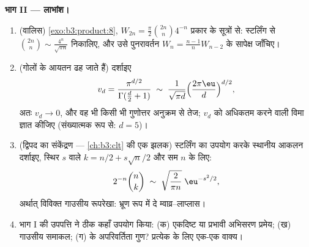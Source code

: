 \begin{problem}
\medskip
\noindent\textbf{भाग II --- लाभांश।}
\begin{enumerate}[resume]
  \item (वालिस) \cref{exo:b3:product:8}, $W_{2n} =
        \frac\pi2\binom{2n}n4^{-n}$ प्रकार के सूत्रों से: स्टर्लिंग से
        $\binom{2n}{n} \sim \frac{4^n}{\sqrt{\pi n}}$ निकालिए, और उसे पुनरावर्तन $W_{n} =
        \frac{n-1}nW_{n-2}$ के सापेक्ष
        जाँचिए।
  \item (गोलों के आयतन ढह जाते हैं) दर्शाइए
        \[
        v_d = \frac{\pi^{d/2}}{\Gamma(\frac d2 + 1)}
        \;\sim\; \frac{1}{\sqrt{\pi d}}
        \Bigl(\frac{2\pi\eu}{d}\Bigr)^{d/2},
        \]
        अतः $v_d \to 0$, और वह भी किसी भी गुणोत्तर अनुक्रम से तेज;
        $v_d$ को अधिकतम करने वाली विमा ज्ञात कीजिए (संख्यात्मक
        रूप से: $d =
        5$)।
  \item (द्विपद का संकेंद्रण --- \cref{ch:b3:clt} की एक झलक) स्टर्लिंग का
        उपयोग करके स्थानीय आकलन दर्शाइए, स्थिर $s$ वाले $k = n/2 + s\sqrt n/2$
        और सम $n$ के लिए:
        \[
        2^{-n}\binom{n}{k} \;\sim\;
        \sqrt{\frac{2}{\pi n}}\;\eu^{-s^2/2},
        \]
        अर्थात् विविक्त गाउसीय रूपरेखा: भ्रूण रूप में
        दे म्वाव्र--लाप्लास।
  \item भाग I की उपपत्ति ने ठीक कहाँ उपयोग किया: (क) एकदिष्ट या
        प्रभावी अभिसरण प्रमेय; (ख) गाउसीय समाकल; (ग) 
        के अपरिवर्तिता गुण? प्रत्येक के लिए एक-एक वाक्य।
\end{enumerate}


\end{problem}
